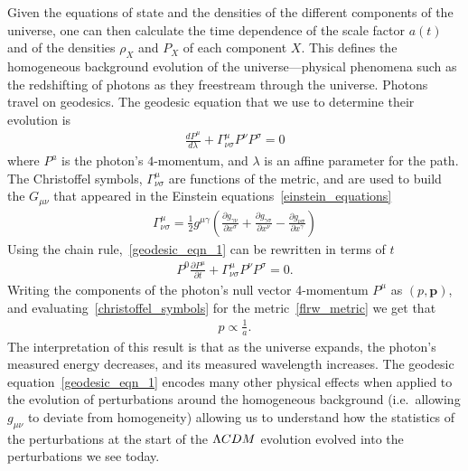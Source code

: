    Given the equations of state and the densities of the different
    components of the universe, one can then calculate the time dependence of the
    scale factor $a(t)$ and of the densities $\rho_X$ and $P_X$ of each component $X$.
    This defines the homogeneous background evolution of the universe---physical phenomena
    such as the redshifting of photons as they freestream through the universe.
    Photons travel on geodesics. The geodesic equation that we use to determine
    their evolution is
    \begin{align}\label{geodesic_eqn_1}
        \frac{dP^\mu}{d\lambda}+\Gamma^\mu_{\nu\sigma}P^\nu P^\sigma=0
    \end{align}
    where $P^a$ is the photon's $4$-momentum, and $\lambda$ is an affine parameter
    for the path.
    The Christoffel symbols, $\Gamma^\mu_{\nu\sigma}$ are functions of the
    metric, and are used to build the $G_{\mu\nu}$ that appeared in the Einstein equations~\eqref{einstein_equations}
    \begin{align}\label{christoffel_symbols}
        \Gamma^\mu_{\nu\sigma} = \frac{1}{2}g^{\mu\gamma}\left(
        \frac{\partial g_{\gamma\nu}}{\partial x^{\sigma}}
        +\frac{\partial g_{\gamma\sigma}}{\partial x^{\nu}}
        -\frac{\partial g_{\nu\sigma}}{\partial x^{\gamma}}
        \right)
    \end{align}
    Using the chain rule,~\eqref{geodesic_eqn_1} can be rewritten in terms of $t$
    \begin{align}
        P^{0}\frac{\partial P^\mu}{\partial t}+\Gamma^\mu_{\nu\sigma}P^\nu P^\sigma=0.
    \end{align}
    Writing the components of the photon's null vector 4-momentum $P^\mu$
    as $(p, \mathbf{p})$, and evaluating~\eqref{christoffel_symbols}
    for the metric~\eqref{flrw_metric} we get that
    \begin{align}
        p\propto \frac{1}{a}.
    \end{align}
    The interpretation of this result is that as the universe expands,
    the photon's measured energy decreases, and its measured wavelength increases.
    The geodesic equation~\eqref{geodesic_eqn_1} encodes many other physical effects when applied
    to the evolution of perturbations around the homogeneous background
    (i.e.\, allowing $g_{\mu\nu}$ to deviate from homogeneity)
    allowing us to understand how the statistics of the perturbations at the
    start of the $\Lambda CDM$ evolution evolved into the perturbations we see today.


